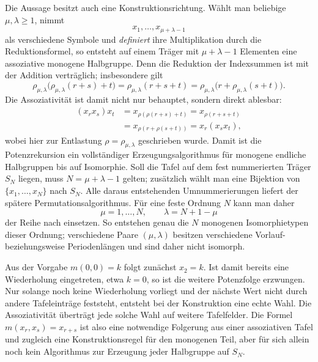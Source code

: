 \documentclass[main.tex]{subfiles}
\begin{document}
Die Aussage besitzt auch eine Konstruktionsrichtung.  Wählt man beliebige
\(\mu,\lambda\geq1\), nimmt
\[
  x_1,\ldots,x_{\mu+\lambda-1}
\]
als verschiedene Symbole und \emph{definiert} ihre Multiplikation durch die
Reduktionsformel, so entsteht auf einem Träger mit
\(\mu+\lambda-1\) Elementen eine assoziative monogene Halbgruppe.  Denn die
Reduktion der Indexsummen ist mit der Addition verträglich; insbesondere gilt
\[
  \rho_{\mu,\lambda}\!
    \bigl(\rho_{\mu,\lambda}(r+s)+t\bigr)
  =
  \rho_{\mu,\lambda}(r+s+t)
  =
  \rho_{\mu,\lambda}\!
    \bigl(r+\rho_{\mu,\lambda}(s+t)\bigr).
\]
Die Assoziativität ist damit nicht nur behauptet, sondern direkt ablesbar:
\[
\begin{aligned}
  (x_r x_s)x_t
  &=x_{\rho(\rho(r+s)+t)}
   =x_{\rho(r+s+t)}\\
  &=x_{\rho(r+\rho(s+t))}
   =x_r(x_sx_t),
\end{aligned}
\]
wobei hier zur Entlastung \(\rho=\rho_{\mu,\lambda}\) geschrieben wurde.
Damit ist die Potenzrekursion ein vollständiger Erzeugungsalgorithmus für
monogene endliche Halbgruppen bis auf Isomorphie.  Soll die Tafel auf dem
fest nummerierten Träger \(S_N\) liegen, muss
\(N=\mu+\lambda-1\) gelten; zusätzlich wählt man eine Bijektion von
\(\{x_1,\ldots,x_N\}\) nach \(S_N\).  Alle daraus entstehenden
Umnummerierungen liefert der spätere Permutationsalgorithmus.  Für eine feste
Ordnung \(N\) kann man daher
\[
  \mu=1,\ldots,N,
  \qquad
  \lambda=N+1-\mu
\]
der Reihe nach einsetzen.  So entstehen genau die \(N\) monogenen
Isomorphietypen dieser Ordnung; verschiedene Paare \((\mu,\lambda)\) besitzen
verschiedene Vorlauf- beziehungsweise Periodenlängen und sind daher nicht
isomorph.

\begin{remark}
Aus der Vorgabe \(m(0,0)=k\) folgt zunächst \(x_2=k\).  Ist damit bereits
eine Wiederholung eingetreten, etwa \(k=0\), so ist die weitere Potenzfolge
erzwungen.  Nur solange noch keine Wiederholung vorliegt und der nächste Wert
nicht durch andere Tafeleinträge feststeht, entsteht bei der Konstruktion
eine echte Wahl.  Die Assoziativität überträgt jede solche Wahl auf weitere
Tafelfelder.  Die Formel \(m(x_r,x_s)=x_{r+s}\) ist also eine notwendige
Folgerung aus einer assoziativen Tafel und zugleich eine Konstruktionsregel
für den monogenen Teil, aber für sich allein noch kein Algorithmus zur
Erzeugung jeder Halbgruppe auf \(S_N\).
\end{remark}


\end{document}
